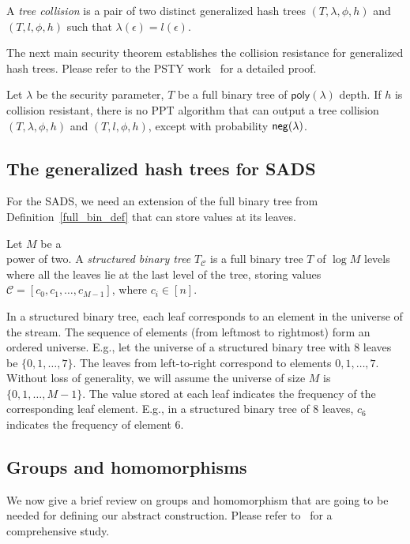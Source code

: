\begin{defn}\label{distinct-trees}
A \emph{tree collision} is a pair of two distinct generalized hash trees $(T,\lambda,\phi,h)$ and $(T,l,\phi,h)$ such that $\lambda(\epsilon)=l(\epsilon)$.
\end{defn}

The next main security theorem establishes the collision resistance for generalized hash trees. Please refer to the PSTY work~\cite{DBLP:conf/eurocrypt/PapamanthouSTY13} for a detailed proof.
\begin{theorem}\label{col_res}
Let $\lambda$ be the security parameter, $T$ be a full binary tree of $\mathsf{poly}(\lambda)$ depth. If $h$ is collision resistant, there is no PPT algorithm that can output a tree collision $(T,\lambda,\phi,h)$ and $(T,l,\phi,h)$, except with probability $\mathsf{neg}(\lambda)$.
\end{theorem}

\subsection{The generalized hash trees for SADS}
For the SADS, we need an extension of the full binary tree from Definition~\ref{full_bin_def} that can store values at its leaves. 
\begin{defn}\label{structured_binary}
Let $M$ be a \\
power of two. A \emph{structured binary tree} $T_\mathcal{C}$ is a full binary tree $T$ of $\log M$ levels where all the leaves lie at the last level of the tree, storing values $\mathcal{C}=[c_0,c_1,\ldots,c_{M-1}]$, where $c_i\in [n]$.  
\end{defn}
In a structured binary tree, each leaf corresponds to an element in the universe of the stream. The sequence of elements (from leftmost to rightmost) form an ordered universe. E.g., let the universe of a structured binary tree with $8$ leaves be $\{0,1,\ldots,7\}$. The leaves from left-to-right correspond to elements $0,1,\ldots,7$. Without loss of generality, we will assume the universe of size $M$ is $\{0,1,\ldots,M-1\}$. The value stored at each leaf indicates the frequency of the corresponding leaf element. E.g., in a structured binary tree of $8$ leaves, $c_6$ indicates the frequency of element $6$.

\subsection{Groups and homomorphisms}
We now give a brief review on groups and homomorphism that are going to be needed for defining our abstract construction. Please refer to~\cite{algebrabook} for a comprehensive study. 


